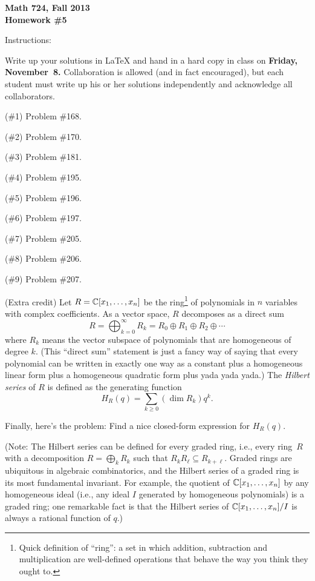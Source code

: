 
\setcounter{exprobno}{0}
\newcommand{\exprob}{\vskip10bp\addtocounter{probno}{1}{\bf(E{\arabic{probno}})}\quad}
\newcommand{\booksection}[1]{\bigskip\hrule\medskip\textbf{#1}}


{\bf Math 724, Fall 2013\\
Homework \#5

Instructions:} Write up your solutions in LaTeX and hand in a hard copy in class on {\bf Friday, November~8.}  Collaboration is allowed (and in fact encouraged), but each student must write up his or her solutions independently and acknowledge all collaborators.

(\#1) Problem \#168.%

(\#2) Problem \#170.%

(\#3) Problem \#181.%

(\#4) Problem \#195.%

(\#5) Problem \#196.%

(\#6) Problem \#197.%

(\#7)  Problem \#205.

(\#8)  Problem \#206.

(\#9)  Problem \#207.

(Extra credit) Let $R=\mathbb{C}[x_1,\dots,x_n]$ be the ring\footnote{Quick definition of ``ring'': a set in which addition, subtraction and multiplication are well-defined operations that behave the way you think they ought to.} of polynomials in $n$ variables with complex coefficients.  As a vector space, $R$ decomposes as a direct sum
\[R = \bigoplus_{k=0}^\infty R_k = R_0\oplus R_1\oplus R_2\oplus\cdots\]
where $R_k$ means the vector subspace of polynomials that are homogeneous of degree $k$.  (This ``direct sum'' statement is just a fancy way of saying that every polynomial can be written in exactly one way as a constant plus a homogeneous linear form plus a homogeneous quadratic form plus yada yada yada.)  The \emph{Hilbert series} of $R$ is defined as the generating function
\[H_R(q)=\sum_{k\geq 0} (\dim R_k) q^k.\]

Finally, here's the problem: Find a nice closed-form expression for $H_R(q)$.

(Note: The Hilbert series can be defined for every graded ring, i.e., every ring~$R$ with a decomposition $R=\bigoplus_k R_k$ such that $R_kR_\ell\subseteq R_{k+\ell}$.  Graded rings are ubiquitous in algebraic combinatorics, and the Hilbert series of a graded ring is its most fundamental invariant.  For example, the quotient of $\mathbb{C}[x_1,\dots,x_n]$ by any homogeneous ideal (i.e., any ideal $I$ generated by homogeneous polynomials) is a graded ring; one remarkable fact is that the Hilbert series of $\mathbb{C}[x_1,\dots,x_n]/I$ is always a rational function of $q$.)

